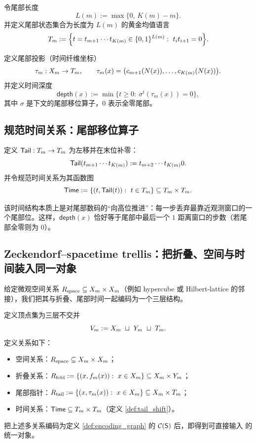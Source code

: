 令尾部长度
$$
L(m):=\max\{0,\,K(m)-m\}.
$$
并定义尾部状态集合为长度为 $L(m)$ 的黄金均值语言
$$
T_m:=\Bigl\{t=t_{m+1}\cdots t_{K(m)}\in\{0,1\}^{L(m)}:\ t_i t_{i+1}=0\Bigr\}.
$$

\begin{definition}[尾部投影与时间深度]\label{def:tail_projection}
定义尾部投影（时间纤维坐标）
$$
\tau_m:X_m\to T_m,\qquad
\tau_m(x)=\bigl(c_{m+1}(N(x)),\dots,c_{K(m)}(N(x))\bigr).
$$
并定义时间深度
$$
\mathsf{depth}(x):=\min\{t\ge 0:\ \sigma^t(\tau_m(x))=0\},
$$
其中 $\sigma$ 是下文的尾部移位算子，$0$ 表示全零尾部。
\end{definition}

\subsection{规范时间关系：尾部移位算子}

\begin{definition}\label{def:tail_shift}
定义 $\mathsf{Tail}:T_m\to T_m$ 为左移并在末位补零：
$$
\mathsf{Tail}(t_{m+1}\cdots t_{K(m)}) := t_{m+2}\cdots t_{K(m)}0.
$$
并令规范时间关系为其函数图
$$
\mathsf{Time}:=\{(t,\mathsf{Tail}(t)):\ t\in T_m\}\subseteq T_m\times T_m.
$$
\end{definition}

\begin{remark}
该时间结构本质上是对尾部数码的“向高位推进”：每一步丢弃最靠近观测窗口的一个尾部位。这样，$\mathsf{depth}(x)$ 恰好等于尾部中最后一个 $1$ 距离窗口的步数（若尾部全零则为 $0$）。
\end{remark}

\subsection{Zeckendorf--spacetime trellis：把折叠、空间与时间装入同一对象}

给定微观空间关系 $R_{\mathrm{space}}\subseteq X_m\times X_m$（例如 hypercube 或 Hilbert-lattice 的邻接），我们把其与折叠、尾部时间一起编码为一个三层结构。

\begin{definition}\label{def:zeckendorf_trellis}
定义顶点集为三层不交并
$$
V_m := X_m\ \sqcup\ Y_m\ \sqcup\ T_m.
$$
定义关系如下：
\begin{itemize}
  \item 空间关系：$R_{\mathrm{space}}\subseteq X_m\times X_m$；
  \item 折叠关系：$R_{\mathrm{fold}}:=\{(x,\Fold(x)):\ x\in\Xm\}\subseteq \Xm\times\Ym$；
  \item 尾部指针：$R_{\mathrm{tail}}:=\{(x,\tau_m(x)):\ x\in\Xm\}\subseteq \Xm\times T_m$；
  \item 时间关系：$\mathsf{Time}\subseteq T_m\times T_m$（定义 \ref{def:tail_shift}）。
\end{itemize}
把上述多关系编码为定义 \ref{def:encoding_graph} 的 $\mathcal{C}(\mathsf S)$ 后，即得到可直接输入 \WL{} 的统一对象。
\end{definition}

